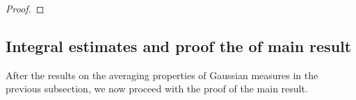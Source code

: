 \documentclass[11pt,a4paper]{article}
\newcommand{\cQ}{\mathcal{Q}}
\newcommand{\Op}{A}
\numberwithin{equation}{section}
\theoremstyle{definition}
\theoremstyle{remark}
\theoremstyle{plain}
\begin{document}
\begin{proof}
\end{proof}

\subsection{Integral estimates and proof the of main result}\label{subsec:mainproof}



After the results on the averaging properties of Gaussian measures in the previous subsection, we now proceed with the proof of the main result.
\end{document}
